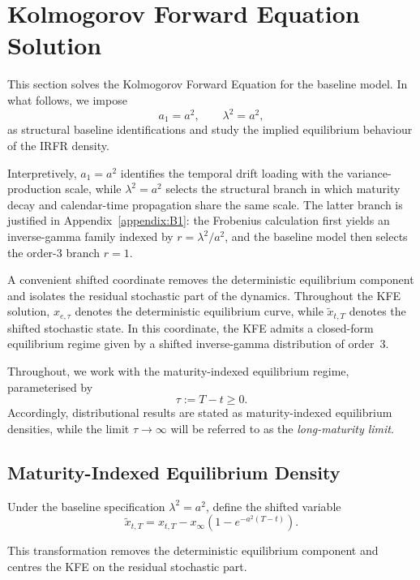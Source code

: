 \documentclass[12pt]{article}
\theoremstyle{statementstyle}
\begin{document}
\section{Kolmogorov Forward Equation Solution}
\label{sec:kfe-solution}

This section solves the Kolmogorov Forward Equation for the baseline model. In
what follows, we impose
\[
a_{1}=a^{2},
\qquad
\lambda^{2}=a^{2},
\]
as structural baseline identifications and study the implied equilibrium
behaviour of the IRFR density.

Interpretively, \(a_{1}=a^{2}\) identifies the temporal drift loading with the
variance-production scale, while \(\lambda^{2}=a^{2}\) selects the structural
branch in which maturity decay and calendar-time propagation share the same
scale. The latter branch is justified in Appendix~\ref{appendix:B1}: the
Frobenius calculation first yields an inverse-gamma family indexed by
\(r=\lambda^{2}/a^{2}\), and the baseline model then selects the order-3 branch
\(r=1\).

A convenient shifted coordinate removes the deterministic equilibrium component
and isolates the residual stochastic part of the dynamics. Throughout the KFE
solution, \(x_{e,\tau}\) denotes the deterministic equilibrium curve, while
\(\widetilde{x}_{t,T}\) denotes the shifted stochastic state. In this coordinate, the
KFE admits a closed-form equilibrium regime given by a shifted inverse-gamma
distribution of order~3.

Throughout, we work with the maturity-indexed equilibrium regime,
parameterised by
\[
\tau:=T-t\ge 0.
\]
Accordingly, distributional results are stated as maturity-indexed
equilibrium densities, while the limit \(\tau\to\infty\) will be
referred to as the \emph{long-maturity limit}.

\subsection{Maturity-Indexed Equilibrium Density}

Under the baseline specification \(\lambda^{2}=a^{2}\), define the shifted variable
\[
\widetilde{x}_{t,T}
=
x_{t,T}
-
x_{\infty}\!\left(1-e^{-a^{2}(T-t)}\right).
\]

This transformation removes the deterministic equilibrium component and centres the
KFE on the residual stochastic part.
\end{document}

